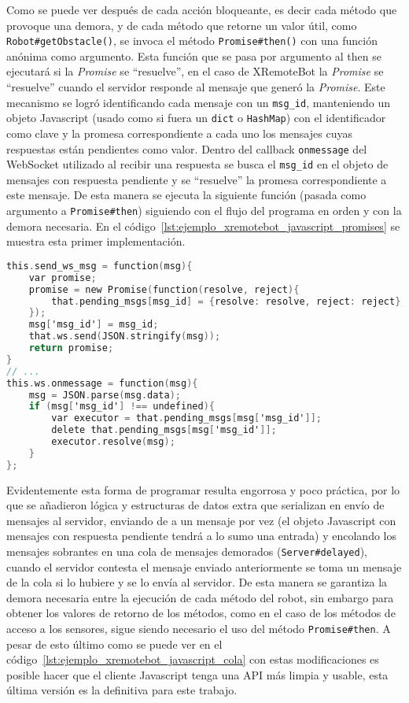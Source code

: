 Como se puede ver después de cada acción bloqueante, es decir cada método que
provoque una demora, y de cada método que retorne un valor útil, como
\texttt{Robot\#getObstacle()}, se invoca el método \texttt{Promise\#then()} con
una función anónima como argumento. Esta función que se pasa por argumento al
then se ejecutará si la \textit{Promise} se ``resuelve'', en el caso de
XRemoteBot la \textit{Promise} se ``resuelve'' cuando el servidor
responde al mensaje que generó la \textit{Promise}.
Este mecanismo se logró identificando cada mensaje con un \texttt{msg\_id},
manteniendo un objeto Javascript (usado como si fuera un \texttt{dict}
o \texttt{HashMap}) con el identificador como clave y la promesa
correspondiente a cada uno los mensajes cuyas respuestas están pendientes
como valor. Dentro del callback \texttt{onmessage} del WebSocket utilizado
al recibir una respuesta se busca el \texttt{msg\_id} en el objeto de
mensajes con respuesta pendiente y se ``resuelve'' la promesa correspondiente
a este mensaje. De esta manera se ejecuta la siguiente función (pasada como
argumento a \texttt{Promise\#then}) siguiendo con el flujo del programa
en orden y con la demora necesaria. En el
código~\ref{lst:ejemplo_xremotebot_javascript_promises} se muestra esta primer
implementación.


\begin{lstlisting}[language=C,
caption={Ejemplo simplificado de la implementación de XRemoteBot con
Promises dentro del constructor Server en remotebot.js},
label=lst:ejemplo_xremotebot_javascript_promises]
this.send_ws_msg = function(msg){
    var promise;
    promise = new Promise(function(resolve, reject){
        that.pending_msgs[msg_id] = {resolve: resolve, reject: reject};
    });
    msg['msg_id'] = msg_id;
    that.ws.send(JSON.stringify(msg));
    return promise;
}
// ...
this.ws.onmessage = function(msg){
    msg = JSON.parse(msg.data);
    if (msg['msg_id'] !== undefined){
        var executor = that.pending_msgs[msg['msg_id']];
        delete that.pending_msgs[msg['msg_id']];
        executor.resolve(msg);
    }
};
\end{lstlisting}


Evidentemente esta forma de programar resulta engorrosa y poco práctica,
por lo que se añadieron
lógica y estructuras de datos extra que serializan en envío de mensajes al
servidor, enviando de a un mensaje por vez (el objeto Javascript con
mensajes con respuesta pendiente tendrá a lo sumo una entrada)
y encolando los mensajes sobrantes
en una cola de mensajes demorados (\texttt{Server\#delayed}), cuando
el servidor contesta el mensaje enviado anteriormente se toma un mensaje
de la cola si lo hubiere y se lo envía al servidor. De esta manera
se garantiza la demora necesaria entre la ejecución de cada método
del robot, sin embargo para obtener los valores de retorno de los métodos,
como en el caso de los métodos de acceso a los sensores, sigue siendo
necesario el uso del método \texttt{Promise\#then}. A pesar de esto último
como se puede ver en el código~\ref{lst:ejemplo_xremotebot_javascript_cola}
con estas modificaciones es posible hacer que el cliente Javascript
tenga una API más limpia y usable, esta última versión es la definitiva
para este trabajo.

